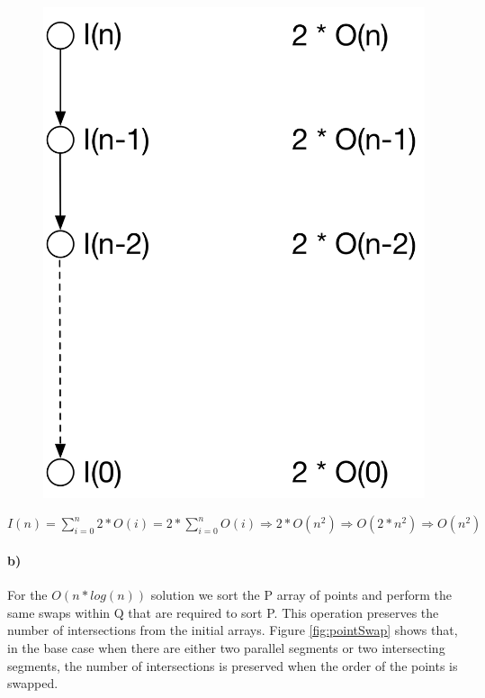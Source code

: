 \begin{figure}[H]
    \centering
    \includegraphics[scale=0.4]{1a)}
\end{figure}

$I(n) = \sum_{i=0}^{n} 2 * O(i) = 2 * \sum_{i=0}^{n} O(i) \Rightarrow  2 * O(n^2) \Rightarrow  O(2 * n^2) \Rightarrow O(n^2)$


\paragraph{b)} For the $O(n*log(n))$ solution we sort the P array of points and perform the same swaps within Q that are required to sort P.
This operation preserves the number of intersections from the initial arrays.
Figure \ref{fig:pointSwap} shows that, in the base case when there are either two parallel segments or two intersecting segments, the number of intersections is preserved when the order of the points is swapped.

